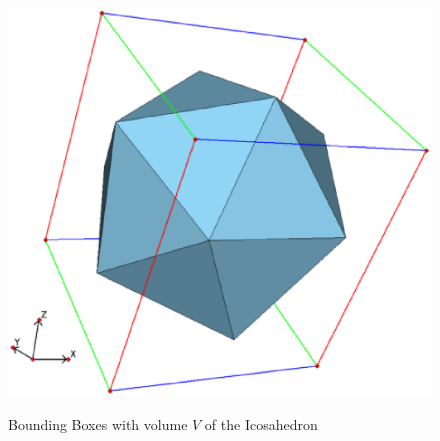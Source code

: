 \documentclass[a4paper,10pt,notitlepage]{scrreprt}
\begin{document}
\begin{figure}
{    \includegraphics[scale=0.4]{bbox-v3-icosahedron.eps}}
 \caption{Bounding Boxes with volume $V$ of the Icosahedron}
 \label{fig:bbox-icosahedron}
\end{figure}
\end{document}
